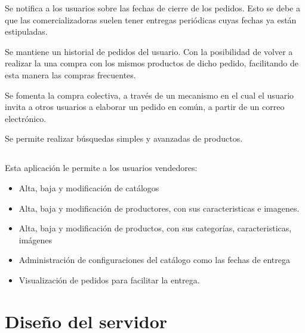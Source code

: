 Se notifica a los usuarios sobre las fechas de cierre de los pedidos. Esto se debe a que las comercializadoras suelen tener entregas periódicas cuyas fechas ya están estipuladas. 


Se mantiene un historial de pedidos del usuario. Con la posibilidad de volver a realizar la una compra con los mismos productos de dicho pedido, facilitando de esta manera las compras frecuentes.

Se fomenta la compra colectiva, a través de un mecanismo en el cual el usuario invita a otros usuarios a elaborar un pedido en común, a partir de un correo electrónico.

Se permite realizar búsquedas simples y avanzadas de productos.




\subsection{\Bo}

Esta aplicación le permite a los usuarios vendedores:

\begin{itemize}
\item Alta, baja y modificación de catálogos
\item Alta, baja y modificación de productores, con sus caracteristicas e imagenes.
\item Alta, baja y modificación de productos, con sus categorías, caracteristicas, imágenes
\item Administración de configuraciones del catálogo como las fechas de entrega
\item Visualización de pedidos para facilitar la entrega.
\end{itemize}



\section{Diseño del servidor}

